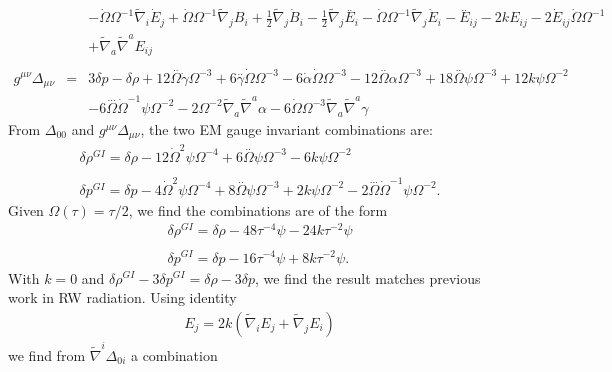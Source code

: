 \documentclass[10pt,letterpaper]{article}
\numberwithin{equation}{section}
\begin{document}
\begin{eqnarray}
&& -  \dot{\Omega} \Omega^{-1} \tilde{\nabla}_{i}\dot{E}_{j} + \dot{\Omega} \Omega^{-1} \tilde{\nabla}_{j}B_{i} + \tfrac{1}{2} \tilde{\nabla}_{j}\dot{B}_{i} -  \tfrac{1}{2} \tilde{\nabla}_{j}\overset{..}{E}_{i} -  \dot{\Omega} \Omega^{-1} \tilde{\nabla}_{j}\dot{E}_{i}- \overset{..}{E}_{ij} - 2 k E_{ij} - 2 \dot{E}_{ij} \dot{\Omega} \Omega^{-1} \nonumber \\ 
&& + \tilde{\nabla}_{a}\tilde{\nabla}^{a}E_{ij}
\\  \nonumber\\ 
g^{\mu\nu}\Delta_{\mu\nu}&=& 3 \delta p -  \delta \rho + 12 \overset{..}{\Omega} \dot{\gamma} \Omega^{-3} + 6 \overset{..}{\gamma} \dot{\Omega} \Omega^{-3} - 6 \dot{\alpha} \dot{\Omega} \Omega^{-3} - 12 \overset{..}{\Omega} \alpha \Omega^{-3} + 18 \overset{..}{\Omega} \psi \Omega^{-3} + 12 k \psi \Omega^{-2} \nonumber \\ 
&& - 6 \overset{...}{\Omega} \dot{\Omega}^{-1} \psi \Omega^{-2} - 2 \Omega^{-2} \tilde{\nabla}_{a}\tilde{\nabla}^{a}\alpha - 6 \dot{\Omega} \Omega^{-3} \tilde{\nabla}_{a}\tilde{\nabla}^{a}\gamma 
\end{eqnarray}
%
From $\Delta_{00}$ and $g^{\mu\nu}\Delta_{\mu\nu}$, the two EM gauge invariant combinations are:
\begin{eqnarray}
&\boxed{\delta \rho^{GI}=\delta \rho - 12 \dot{\Omega}^2 \psi \Omega^{-4} + 6 \overset{..}{\Omega} \psi \Omega^{-3} - 6 k \psi \Omega^{-2}}&
\\ \nonumber\\ 
&\boxed{\delta p^{GI}=\delta p - 4 \dot{\Omega}^2 \psi \Omega^{-4} + 8 \overset{..}{\Omega} \psi \Omega^{-3} + 2 k \psi \Omega^{-2} - 2 \overset{...}{\Omega} \dot{\Omega}^{-1} \psi \Omega^{-2}}.&
\end{eqnarray}
Given $\Omega(\tau) = \tau/2$, we find the combinations are of the form
\begin{eqnarray}
&\delta\rho^{GI}=\delta \rho - 48 \tau^{-4} \psi - 24 k \tau^{-2} \psi &
\\ \nonumber\\
&\delta p^{GI} = \delta p - 16 \tau^{-4} \psi + 8 k \tau^{-2} \psi.&
\end{eqnarray}
With $k=0$ and $\delta \rho^{GI}-3\delta p^{GI} = \delta \rho - 3\delta p$, we find the result matches previous work in RW radiation. Using identity
\begin{eqnarray}
[\tilde\nabla_a\tilde\nabla^a,\tilde\nabla_i]E_j = 2k(\tilde\nabla_i E_j + \tilde\nabla_j E_i)
\end{eqnarray}
we find from $\tilde\nabla^i \Delta_{0i}$ a combination
\end{document}
